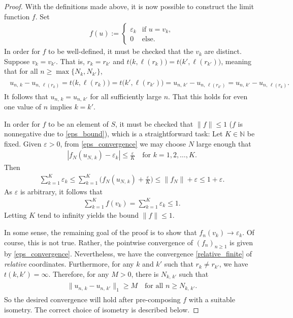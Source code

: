 \documentclass[11pt,reqno]{amsart}
\numberwithin{equation}{section}
\theoremstyle{definition}
\begin{document}
\begin{proof}
With the definitions made above, it is now possible to construct the limit function $f$.
Set
{\begin{align*} {
f(u) := \begin{cases} 
{\varepsilon}_k &\text{if } u = v_k, \\
0 &\text{else.}
\end{cases}
} \end{align*}}
In order for $f$ to be well-defined, it must be checked that the $v_k$ are distinct.
Suppose $v_k = v_{k'}$.
That is, $r_{k} = r_{k'}$ and $t\big(k,\ell(r_k)\big) = t\big(k',\ell(r_{k'})\big)$, meaning that for all $n \geq \max\{N_k,N_{k'}\}$,
{\begin{align} \begin{split} {
u_{n,\, k} - u_{n,\, \ell(r_k)} 
= t\big(k,\ell(r_k)\big)
= t\big(k',\ell(r_{k'})\big)
= u_{n,\, k'} - u_{n,\, \ell(r_{k'})} 
= u_{n,\, k'} - u_{n,\, \ell(r_k)}.
} \end{split} \end{align}}
It follows that $u_{n,\, k} = u_{n,\, k'}$ for all sufficiently large $n$.
That this holds for even one value of $n$ implies $k = k'$.

In order for $f$ to be an element of $S$, it must be checked that $\|f\| \leq 1$
($f$ is nonnegative due to \eqref{eps_bound}), which is a straightforward task:
Let $K \in {\mathbb{N}}$ be fixed.
Given ${\varepsilon} > 0$, from \eqref{eps_convergence} we may choose $N$ large enough that
{\begin{align*} {
|f_N(u_{N,\, k}) - {\varepsilon}_k| \leq\frac{\varepsilon}{K} \quad \text{for } k = 1,2,\dots,K.
} \end{align*}}
Then
{\begin{align*} {
\sum_{k = 1}^K {\varepsilon}_k \leq \sum_{k = 1}^K \bigg(f_N(u_{N,\, k}) + \frac{\varepsilon}{K}\bigg) \leq \|f_N\| + {\varepsilon} \leq 1 + {\varepsilon}.
} \end{align*}}
As ${\varepsilon}$ is arbitrary, it follows that
{\begin{align*} {
\sum_{k = 1}^K f(v_k) = \sum_{k=1}^K {\varepsilon}_k \leq 1.
} \end{align*}}
Letting $K$ tend to infinity yields the bound $\|f\| \leq 1$.

In some sense, the remaining goal of the proof is to show that $f_n(v_k) \to {\varepsilon}_k$.
Of course, this is not true.
Rather, the pointwise convergence of $(f_n)_{n \geq 1}$ is given by \eqref{eps_convergence}.
Nevertheless, we have the convergence \eqref{relative_finite} of \textit{relative} coordinates.
Furthermore, for any $k$ and $k'$ such that $r_k \neq r_{k'}$, we have $t(k,k') = \infty$. 
Therefore, for any $M > 0$, there is $N_{k,\, k'}$ such that
{\begin{align} \begin{split} {
\|u_{n,\, k} - u_{n,\, k'}\|_1 \geq M \quad \text{for all $n \geq N_{k,\, k'}$.} \label{relative_infinite}
} \end{split} \end{align}}
So the desired convergence will hold after pre-composing $f$ with a suitable isometry.
The correct choice of isometry is described below.


\end{proof}
\end{document}
